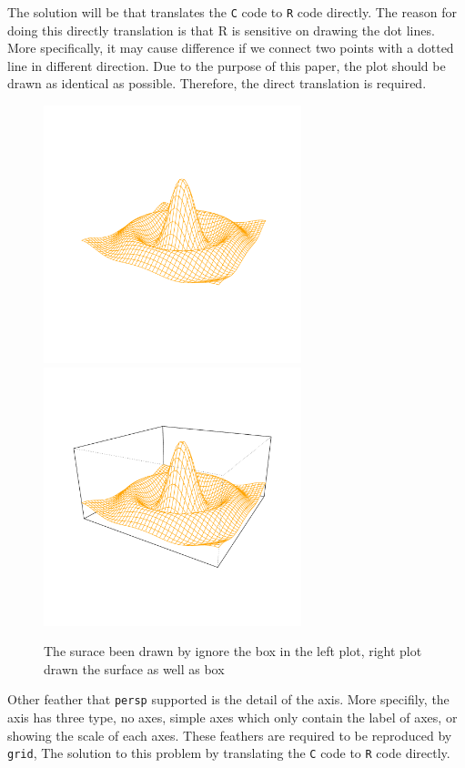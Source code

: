 \documentclass[paper=a4, fontsize=11pt]{report}
\begin{document}
The solution will be that translates the \texttt{C} code to \texttt{R} code directly. The reason for doing this directly translation is that R is sensitive on drawing the dot lines. More specifically, it may cause difference if we connect two points with a dotted line in different direction. Due to the purpose of this paper, the plot should be drawn as identical as possible. Therefore, the direct translation is required.\\


\begin{figure}[h]
\begin{center}
  \includegraphics[height = 7.5cm, width = 7.5cm]{figure/box_example_1.pdf}
  \includegraphics[height = 7.5cm, width = 7.5cm]{figure/box_example_2.pdf}
  \caption{The surace been drawn by ignore the box in the left plot, right plot drawn the surface as well as box}
  	\label{figure8}
\end{center}
\end{figure}

Other feather that \texttt{persp} supported is the detail of the axis. More specifily, the axis has three type, no axes, simple axes which only contain the label of axes, or showing the scale of each axes. These feathers are required to be reproduced by \texttt{grid}, The solution to this problem by translating the \texttt{C} code to \texttt{R} code directly.
\end{document}
